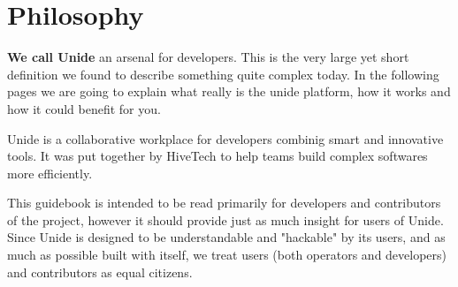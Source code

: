 \section*{Philosophy}

\textbf{We call Unide} an arsenal for developers. This is the very large yet
short definition we found to describe something quite complex today. In the
following pages we are going to explain what really is the unide platform, how
it works and how it could benefit for you.
\newline

Unide is a collaborative workplace for developers combinig smart and innovative
tools. It was put together by HiveTech to help teams build complex softwares
more efficiently.
\newline

This guidebook is intended to be read primarily for developers and contributors
of the project, however it should provide just as much insight for users of
Unide. Since Unide is designed to be understandable and "hackable" by its
users, and as much as possible built with itself, we treat users (both
operators and developers) and contributors as equal citizens.
